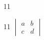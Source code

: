 \documentclass[paper=A4]{ropas-poster}
\begin{document}
\begin{postergrid}{1}{1}
\begin{posterblock}{1}{1}
$\begin{vmatrix}a&b\\c&d\end{vmatrix}$
\end{posterblock}
\end{postergrid}
\end{document}
